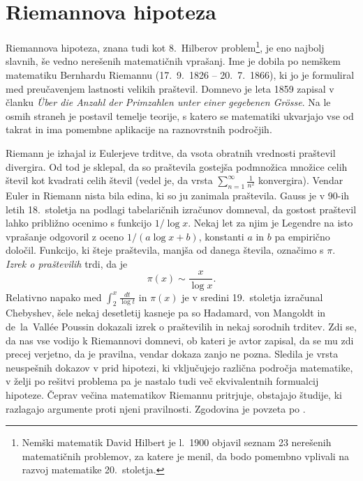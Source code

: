 \documentclass[mat1]{fmfdelo}
\begin{document}
\section{Riemannova hipoteza}

Riemannova hipoteza, znana tudi kot 8.~Hilberov problem\footnote{Nemški matematik David Hilbert je l.~1900 objavil seznam 23 nerešenih matematičnih problemov, za katere je menil, da bodo pomembno vplivali na razvoj matematike 20.~stoletja.}, je eno najbolj slavnih, še vedno nerešenih matematičnih vprašanj. Ime je dobila po nemškem matematiku Bernhardu Riemannu (17.\ 9.\ 1826 -- 20.\ 7.\ 1866), ki jo je formuliral med preučavenjem lastnosti velikih praštevil. Domnevo je leta 1859 zapisal v članku \emph{\"Uber die Anzahl der Primzahlen unter einer gegebenen Gr\"osse}. Na le osmih straneh je postavil temelje teorije, s katero se matematiki ukvarjajo vse od takrat in ima pomembne aplikacije na raznovrstnih področjih. 

Riemann je izhajal iz Eulerjeve trditve, da vsota obratnih vrednosti praštevil divergira. Od tod je sklepal, da so praštevila gostejša podmnožica množice celih števil kot kvadrati celih števil (vedel je, da vrsta $\sum_{n=1}^{\infty} \frac{1}{n^2}$ konvergira).
Vendar Euler in Riemann nista bila edina, ki so ju zanimala praštevila. Gauss je v 90-ih letih 18.~stoletja na podlagi tabelaričnih izračunov domneval, da gostost praštevil lahko približno ocenimo s funkcijo $1/ \log{x}$. Nekaj let za njim je Legendre na isto vprašanje odgovoril z oceno $1/ (a\log{x}+b)$, konstanti $a$ in $b$ pa empirično določil. 
Funkcijo, ki šteje praštevila, manjša od danega števila, označimo s $\pi$. \emph{Izrek o praštevilih} trdi, da je
\begin{equation}
\pi(x) \sim \frac{x}{\log{x}}.
\end{equation}
%
Relativno napako med $\int_{2}^x \frac{dt}{\log{t}}$ in $\pi(x)$ je v sredini 19.~stoletja izračunal Chebyshev, šele nekaj desetletij kasneje pa so Hadamard, von Mangoldt in de~la~Vall\'ee Poussin dokazali izrek o praštevilih in nekaj sorodnih trditev. Zdi se, da nas vse vodijo k Riemannovi domnevi, ob kateri je avtor zapisal, da se mu zdi precej verjetno, da je pravilna, vendar dokaza zanjo ne pozna. Sledila je vrsta neuspešnih dokazov v prid hipotezi, ki vključujejo različna področja matematike, v želji po rešitvi problema pa je nastalo tudi več ekvivalentnih formualcij hipoteze. Čeprav večina matematikov Riemannu pritrjuje, obstajajo študije, ki razlagajo argumente proti njeni pravilnosti.
Zgodovina je povzeta po \cite[poglavje 1.1]{zetafunction}.
%
\end{document}

